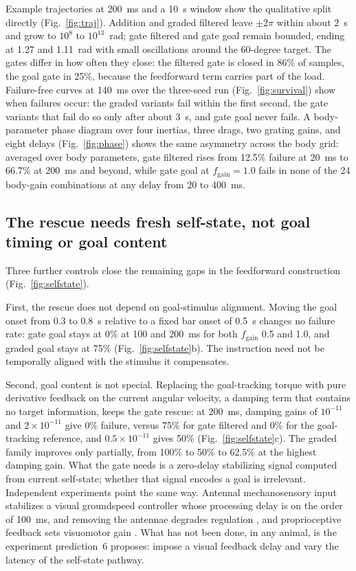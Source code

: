 \documentclass[pdflatex,sn-nature]{sn-jnl}
\begin{document}
Example trajectories at 200~ms and a 10~s window show the qualitative split directly (Fig.~\ref{fig:traj}). Addition and graded filtered leave $\pm 2\pi$ within about 2~s and grow to $10^8$ to $10^{13}$~rad; gate filtered and gate goal remain bounded, ending at 1.27 and 1.11~rad with small oscillations around the 60-degree target. The gates differ in how often they close: the filtered gate is closed in 86\% of samples, the goal gate in 25\%, because the feedforward term carries part of the load. Failure-free curves at 140~ms over the three-seed run (Fig.~\ref{fig:survival}) show when failures occur: the graded variants fail within the first second, the gate variants that fail do so only after about 3~s, and gate goal never fails. A body-parameter phase diagram over four inertias, three drags, two grating gains, and eight delays (Fig.~\ref{fig:phase}) shows the same asymmetry across the body grid: averaged over body parameters, gate filtered rises from 12.5\% failure at 20~ms to 66.7\% at 200~ms and beyond, while gate goal at $f_{\mathrm{gain}} = 1.0$ fails in none of the 24 body-gain combinations at any delay from 20 to 400~ms.

\subsection{The rescue needs fresh self-state, not goal timing or goal content}

Three further controls close the remaining gaps in the feedforward construction (Fig.~\ref{fig:selfstate}).

First, the rescue does not depend on goal-stimulus alignment. Moving the goal onset from 0.3 to 0.8~s relative to a fixed bar onset of 0.5~s changes no failure rate: gate goal stays at 0\% at 100 and 200~ms for both $f_{\mathrm{gain}}$ 0.5 and 1.0, and graded goal stays at 75\% (Fig.~\ref{fig:selfstate}b). The instruction need not be temporally aligned with the stimulus it compensates.

Second, goal content is not special. Replacing the goal-tracking torque with pure derivative feedback on the current angular velocity, a damping term that contains no target information, keeps the gate rescue: at 200~ms, damping gains of $10^{-11}$ and $2\times 10^{-11}$ give 0\% failure, versus 75\% for gate filtered and 0\% for the goal-tracking reference, and $0.5\times 10^{-11}$ gives 50\% (Fig.~\ref{fig:selfstate}c). The graded family improves only partially, from 100\% to 50\% to 62.5\% at the highest damping gain. What the gate needs is a zero-delay stabilizing signal computed from current self-state; whether that signal encodes a goal is irrelevant. Independent experiments point the same way. Antennal mechanosensory input stabilizes a visual groundspeed controller whose processing delay is on the order of 100~ms, and removing the antennae degrades regulation \cite{fuller2014flying}, and proprioceptive feedback sets visuomotor gain \cite{bartussek2016proprioceptive}. What has not been done, in any animal, is the experiment prediction~6 proposes: impose a visual feedback delay and vary the latency of the self-state pathway.
\end{document}

